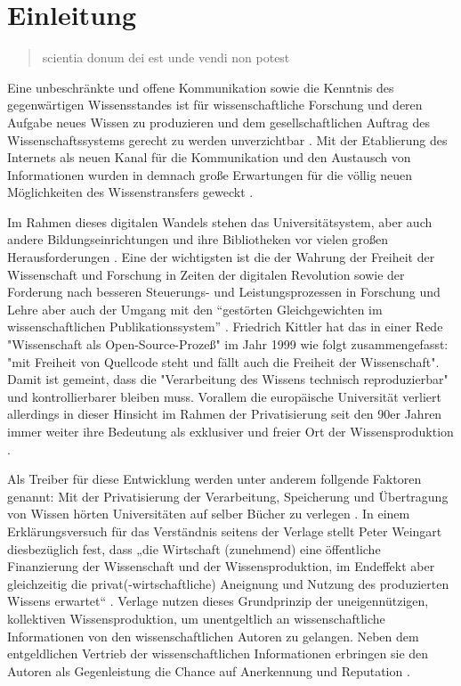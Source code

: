 \chapter{Einleitung} 

\begin{quote}
scientia donum dei est unde vendi non potest
\end{quote}Eine unbeschränkte und offene Kommunikation sowie die Kenntnis des gegenwärtigen Wissensstandes ist für wissenschaftliche Forschung und deren Aufgabe neues Wissen zu produzieren und dem gesellschaftlichen Auftrag des Wissenschaftssystems gerecht zu werden unverzichtbar \cite{Hanekop_2014} \cite{glaeser2006} \cite{gibbons_1994} \cite{Luhmann1998}. Mit der Etablierung des Internets als neuen Kanal für die Kommunikation und den Austausch von Informationen wurden in demnach große Erwartungen für die völlig neuen Möglichkeiten des Wissenstransfers geweckt \cite{Hanekop_2014} \cite{schulze_2013_open} \cite{albert_2006_open_implications} \cite{Goodrum_2001} \cite{Lawrence_1999}. 

Im Rahmen dieses digitalen Wandels stehen das Universitätsystem, aber auch andere Bildungseinrichtungen und ihre Bibliotheken vor vielen großen Herausforderungen \cite{Harter2006} \cite{Gu_don_2004} \cite{osterloh2008anreize}. Eine der wichtigsten ist die der Wahrung der Freiheit der Wissenschaft und Forschung in Zeiten der digitalen Revolution sowie der Forderung nach besseren Steuerungs- und Leistungsprozessen in Forschung und Lehre \cite{Adler_2009} \cite{gibbons_1994} aber auch der Umgang mit den “gestörten Gleichgewichten im wissenschaftlichen Publikationssystem” \cite{cite:0}. Friedrich Kittler hat das in einer Rede "Wissenschaft als Open-Source-Prozeß" im Jahr 1999 wie folgt zusammengefasst: "mit Freiheit von Quellcode steht und fällt auch die Freiheit der Wissenschaft". Damit ist gemeint, dass die "Verarbeitung des Wissens technisch reproduzierbar" \cite{cite:1} und kontrollierbarer bleiben muss. Vorallem die europäische Universität verliert allerdings in dieser Hinsicht im Rahmen der Privatisierung seit den 90er Jahren immer weiter ihre Bedeutung als exklusiver und freier Ort der Wissensproduktion \cite{suchen}.

Als Treiber für diese Entwicklung werden unter anderem follgende Faktoren genannt: Mit der Privatisierung der Verarbeitung, Speicherung und Übertragung von Wissen hörten Universitäten auf selber Bücher zu verlegen \cite{cite:0}. In einem Erklärungsversuch für das Verständnis seitens der Verlage stellt Peter Weingart diesbezüglich fest, dass „die Wirtschaft (zunehmend) eine öffentliche Finanzierung der Wissenschaft und der Wissensproduktion, im Endeffekt aber gleichzeitig die privat(-wirtschaftliche) Aneignung und Nutzung des produzierten Wissens erwartet“ \cite{cite:2}. Verlage nutzen dieses Grundprinzip der uneigennützigen, kollektiven Wissensproduktion, um unentgeltlich an wissenschaftliche Informationen von den wissenschaftlichen Autoren zu gelangen. Neben dem entgeldlichen Vertrieb der wissenschaftlichen Informationen erbringen sie den Autoren als Gegenleistung die Chance auf Anerkennung und Reputation \cite{cite:21a}. 

